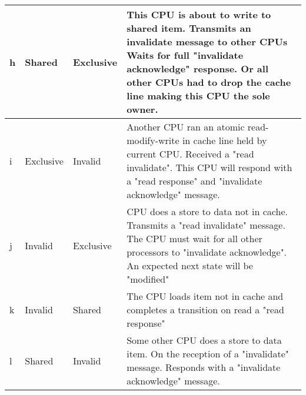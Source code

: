 \documentclass{article}
\begin{document}
\begin{tabular} {| l | l | l | p{9cm}| }
    \\
    \hline
    h & Shared & Exclusive & 

    This CPU is about to write to shared item. Transmits an invalidate
    message to other CPUs Waits for full "invalidate acknowledge"
    response. Or all other CPUs had to drop the cache line making this
    CPU the sole owner. \\
    \hline
    i & Exclusive & Invalid & 

    Another CPU ran an atomic read-modify-write in cache line held by
    current CPU. Received a "read invalidate". This CPU will respond
    with a "read response" and "invalidate acknowledge" message.   \\

    \hline

    j & Invalid & Exclusive &

    CPU does a store to data not in cache. Transmits a "read
    invalidate" message. The CPU must wait for all other processors to
    "invalidate acknowledge". An expected next state will be
    "modified"  
    \\
    \hline

    k & Invalid & Shared &
    
    The CPU loads item not in cache and completes a transition on read
    a "read response"     \\


    \hline
    l & Shared & Invalid &
    
    Some other CPU does a store to data item. On the reception of a
    "invalidate" message. Responds with a "invalidate acknowledge"
    message. \\

    \hline    
\end{tabular}


\end{document}
